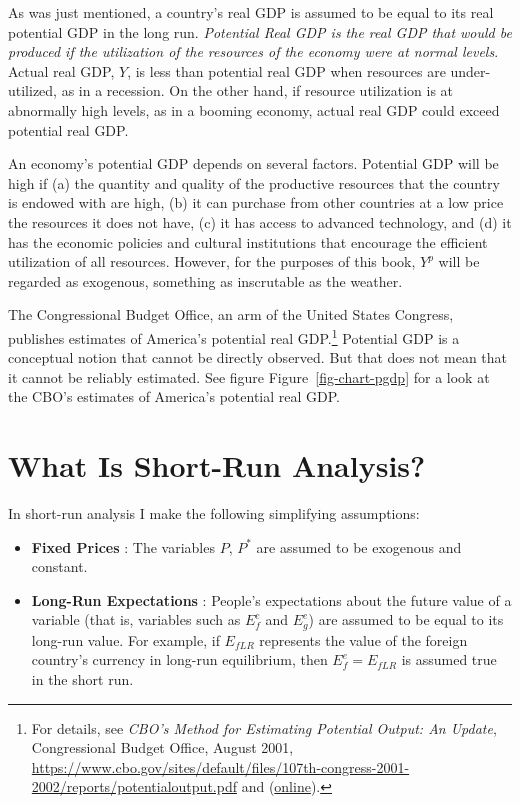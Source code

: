 \documentclass[
  letterpaper,
]{book}
\providecommand{\tightlist}{%
  \setlength{\itemsep}{0pt}\setlength{\parskip}{0pt}}\usepackage{longtable,booktabs,array}
\theoremstyle{plain}
\theoremstyle{remark}
\begin{document}
As was just mentioned, a country's real GDP is assumed to be equal to
its real potential GDP in the long run. \emph{Potential Real GDP is the
real GDP that would be produced if the utilization of the resources of
the economy were at normal
levels}. Actual real GDP, \(Y\),
is less than potential real GDP when resources are under-utilized, as in
a recession. On the other hand, if resource utilization is at abnormally
high levels, as in a booming economy, actual real GDP could exceed
potential real GDP.

An economy's potential GDP depends on several factors. Potential GDP
will be high if (a) the quantity and quality of the productive resources
that the country is endowed with are high, (b) it can purchase from
other countries at a low price the resources it does not have, (c) it
has access to advanced technology, and (d) it has the economic policies
and cultural institutions that encourage the efficient utilization of
all resources. However, for the purposes of this book, \(Y^p\) will be
regarded as exogenous, something as inscrutable as the weather.

The Congressional Budget Office, an arm of the United States Congress,
publishes estimates of America's potential real GDP.\footnote{For
  details, see \emph{CBO's Method for Estimating Potential Output: An
  Update}, Congressional Budget Office, August 2001,
  \url{https://www.cbo.gov/sites/default/files/107th-congress-2001-2002/reports/potentialoutput.pdf}
  and \textcite{shackleton2018estimating}
  (\href{https://www.cbo.gov/publication/53558}{online}).} Potential GDP
is a conceptual notion that cannot be directly observed. But that does
not mean that it cannot be reliably estimated. See figure
Figure~\ref{fig-chart-pgdp} for a look at the CBO's estimates of
America's potential real GDP.

\section{What Is Short-Run Analysis?}\label{sec-shortana}

In short-run analysis I
make the following simplifying assumptions:

\begin{itemize}
\tightlist
\item
  \textbf{Fixed Prices} : The
  variables \(P\), \(P^*\) are assumed to be exogenous and constant.
\item
  \textbf{Long-Run Expectations}
  : People's expectations
  about the future value of a variable (that is, variables such as
  \(E^e_f\) and \(E^e_g\)) are assumed to be equal to its long-run
  value. For example, if \(E_{fLR}\) represents the value of the foreign
  country's currency in long-run equilibrium, then \(E^e_f=E_{fLR}\) is
  assumed true in the short run.
\end{itemize}
\end{document}
